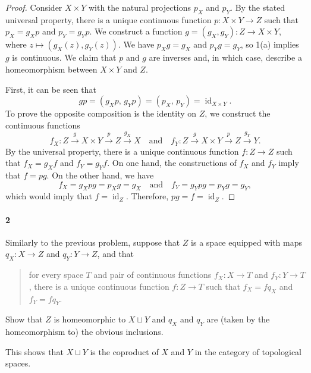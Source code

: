 \documentclass[12pt]{article}
\newlength{\myparskip}
\newenvironment{fullbox}{\begin{lrbox}{\savefullbox}\begin{minipage}{\dimexpr\textwidth-2\fboxsep\relax}\setlength{\parskip}{\myparskip}}{\end{minipage}\end{lrbox}\framebox[\textwidth]{\usebox{\savefullbox}}}
\newenvironment{pbox}[1][]{\begin{fullbox}\ifx#1\empty\else\paragraph{#1}\fi}{\end{fullbox}}
\theoremstyle{definition}
\newcommand{\isp}[1]{\quad\text{#1}\quad}
\newcommand{\<}{\langle}
\renewcommand{\>}{\rangle}
\DeclareMathOperator{\id}{id}
\begin{document}
\begin{proof}
    Consider $X \times Y$ with the natural projections $p_X$ and $p_Y$. By the stated universal property, there is a unique continuous function $p : X \times Y \to Z$ such that $p_X = g_Xp$ and $p_Y = g_Yp$. We construct a function $g = (g_X, g_Y) : Z \to X \times Y$, where $z \mapsto (g_X(z), g_Y(z))$. We have $p_Xg = g_X$ and $p_Yg = g_Y$, so 1(a) implies $g$ is continuous. We claim that $p$ and $g$ are inverses and, in which case, describe a homeomorphism between $X \times Y$ and $Z$.
    
    First, it can be seen that
    \[
        gp  = (g_Xp,\, g_Yp) = (p_X,\, p_Y) = \id_{X \times Y}.
    \]
    To prove the opposite composition is the identity on $Z$, we construct the continuous functions
    \[
        f_X : Z \xrightarrow{g} X \times Y \xrightarrow{p} Z \xrightarrow{g_X} X
        \isp{and}
        f_Y : Z \xrightarrow{g} X \times Y \xrightarrow{p} Z \xrightarrow{g_Y} Y.
    \]
    By the universal property, there is a unique continuous function $f : Z \to Z$ such that $f_X = g_Xf$ and $f_Y = g_Yf$. On one hand, the constructions of $f_X$ and $f_Y$ imply that $f = pg$. On the other hand, we have
    \[
        f_X = g_Xpg = p_Xg = g_X
        \isp{and}
        f_Y = g_Ypg = p_Yg = g_Y,
    \]
    which would imply that $f = \id_Z$. Therefore, $pg = f = \id_Z$.

\end{proof}



\newpage
\begin{pbox}[2]
    Similarly to the previous problem, suppose that $Z$ is a space equipped
      with maps $q_X:X \to Z$ and $q_Y:Y \to Z$, and that
      \begin{quote}
        for every space $T$ and pair of continuous functions $f_X:X \to T$ and
        $f_Y:Y \to T$, there is a unique continuous function $f:Z \to T$ such that
        $f_X=fq_X$ and $f_Y=fq_Y$.
      \end{quote}
      Show that $Z$ is homeomorphic to $X \sqcup Y$ and $q_X$ and $q_Y$ are (taken by the homeomorphism to) the obvious inclusions.
      \medskip
    
      \noindent This shows that $X \sqcup Y$ is the coproduct of $X$ and $Y$ in the category of topological spaces.
\end{pbox}
\end{document}
